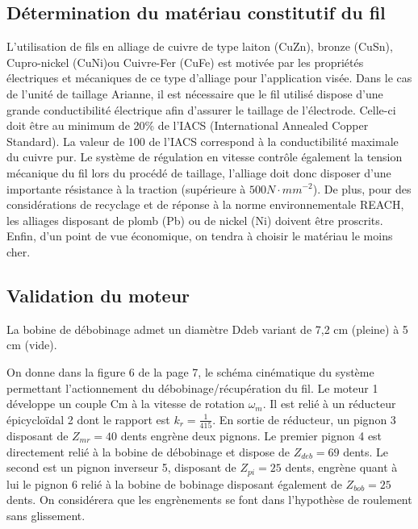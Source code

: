 \subsection{Détermination du matériau constitutif du fil}

L'utilisation de fils en alliage de cuivre de type laiton (CuZn), bronze (CuSn), Cupro-nickel (CuNi)ou Cuivre-Fer (CuFe) est motivée par les propriétés électriques et mécaniques de ce type d'alliage pour l'application visée. Dans le cas de l'unité de taillage Arianne, il est nécessaire que le fil utilisé dispose d'une grande conductibilité électrique afin d'assurer le taillage de l'électrode. Celle-ci doit être au minimum de 20\% de l'IACS (International Annealed Copper Standard). La valeur de 100%
de l'IACS correspond à la conductibilité maximale du cuivre pur. Le système de régulation en vitesse contrôle également la tension mécanique du fil lors du procédé de taillage, l'alliage doit donc disposer d'une importante résistance à la traction (supérieure à $500N\cdot mm^{-2}$). De plus, pour des considérations de recyclage et de réponse à la norme environnementale REACH, les alliages disposant de plomb (Pb) ou de nickel (Ni) doivent être proscrits. Enfin, d'un point de vue économique, on tendra à choisir le matériau le moins cher.


\subsection{Validation du moteur}

La bobine de débobinage admet un diamètre Ddeb variant de 7,2 cm (pleine) à 5 cm (vide).

On donne dans la figure 6 de la page 7, le schéma cinématique du système permettant l'actionnement du débobinage/récupération du fil. Le moteur 1 développe un couple Cm à la vitesse de rotation $\omega_m$. Il est relié à un réducteur épicycloïdal 2 dont le rapport est $k_r=\frac{1}{415}$. En sortie de réducteur, un pignon 3 disposant de $Z_{mr}=40$ dents engrène deux pignons. Le premier pignon 4 est directement relié à la bobine de débobinage et dispose de $Z_{deb}=69$ dents. Le second est un pignon inverseur 5, disposant de $Z_{pi}=25$ dents, engrène quant à lui le pignon 6 relié à la bobine de bobinage disposant également de $Z_{bob}=25$ dents. On considérera que les engrènements se font dans l'hypothèse de roulement sans glissement.

